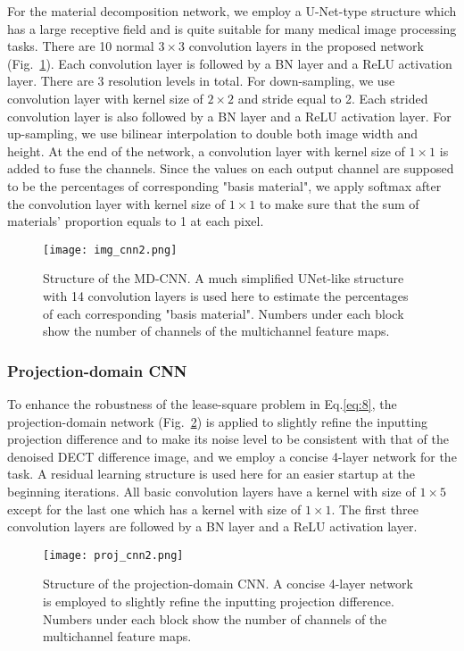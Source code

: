 \documentclass[journal,twoside,web]{ieeecolor}
\begin{document}
For the material decomposition network, we employ a U-Net-type structure\cite{ref51} which has a large receptive field and is quite suitable for many medical image processing tasks. There are 10 normal \(3\times3\) convolution layers in the proposed network (Fig.~\ref{fig:3}). Each convolution layer is followed by a BN layer and a ReLU activation layer. There are 3 resolution levels in total. For down-sampling, we use convolution layer with kernel size
of \(2\times2\) and stride equal to 2. Each strided convolution layer is also followed by a BN layer and a ReLU activation layer. For up-sampling, we use bilinear interpolation to double both image width and height. At the end of the network, a convolution layer with kernel size
of \(1\times1\) is added to fuse the channels. Since the values on each output channel are supposed to be the percentages of corresponding "basis material", we apply softmax after the convolution layer with kernel size
of \(1\times1\) to make sure that the sum of materials’ proportion equals to 1 at each pixel.

\begin{figure}[t]%
    \centering
        \texttt{[image: img\_cnn2.png]}
        \caption{Structure of the MD-CNN. A much simplified UNet-like structure with 14 convolution layers is used here to estimate the percentages of each corresponding "basis material". Numbers under each block show
the number of channels of the multichannel feature maps.}
    \label{fig:3}
\end{figure}

\subsubsection{Projection-domain CNN}

To enhance the robustness of the lease-square problem in Eq.\eqref{eq:8}, the projection-domain network (Fig.~\ref{fig:4}) is applied to slightly refine the inputting projection difference and to make its noise level to be consistent with that of the denoised DECT difference image, and we employ a concise 4-layer network for the task. A residual learning structure is used here for an easier startup at the beginning iterations. All basic convolution layers have a kernel with size of \(1\times5\) except for the last one which has a kernel with size of \(1\times1\). The first three convolution layers are followed by a BN layer and a ReLU activation layer.

\begin{figure}[t]%
    \centering
        \texttt{[image: proj\_cnn2.png]}
        \caption{Structure of the projection-domain CNN. A concise 4-layer network is employed to slightly refine the inputting projection difference. Numbers under each block show the number of channels of the multichannel feature maps.}
    \label{fig:4}
\end{figure}
\end{document}
